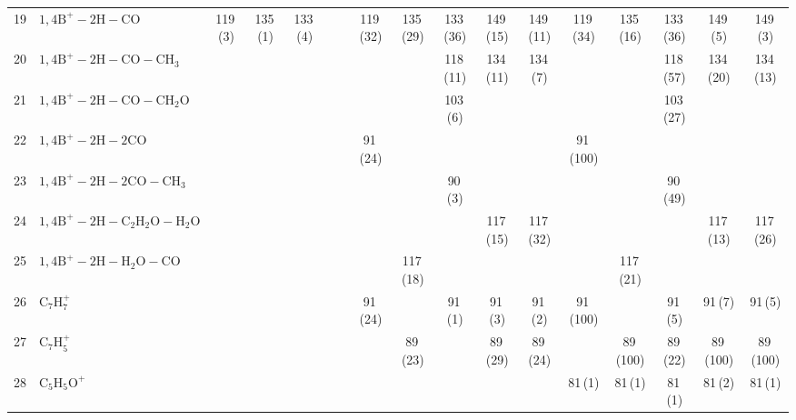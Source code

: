 \documentclass[]{article}
\begin{document}
\begin{table}
{\begin{tabular}{ll|ccccc|ccccc|ccccc}
  19 & $\mathrm{1{,}4B^+{-}2H{-}CO}$ & 119\,(3) & 135\,(1) & 133\,(4) &  &  & 119\,(32) & 135\,(29) & 133\,(36) & 149\,(15) & 149\,(11) & 119\,(34) & 135\,(16) & 133\,(36) & 149\,(5) & 149\,(3) \\ 
  20 & $\mathrm{1{,}4B^+{-}2H{-}CO{-}CH_{3}}$ &  &  &  &  &  &  &  & 118\,(11) & 134\,(11) & 134\,(7) &  &  & 118\,(57) & 134\,(20) & 134\,(13) \\ 
  21 & $\mathrm{1{,}4B^+{-}2H{-}CO{-}CH_{2}O}$ &  &  &  &  &  &  &  & 103\,(6) &  &  &  &  & 103\,(27) &  &  \\ 
  22 & $\mathrm{1{,}4B^+{-}2H{-}2CO}$ &  &  &  &  &  & 91\,(24) &  &  &  &  & 91\,(100) &  &  &  &  \\ 
  23 & $\mathrm{1{,}4B^+{-}2H{-}2CO{-}CH_{3}}$ &  &  &  &  &  &  &  & 90\,(3) &  &  &  &  & 90\,(49) &  &  \\ 
  24 & $\mathrm{1{,}4B^+{-}2H{-}C_{2}H_{2}O{-}H_{2}O}$ &  &  &  &  &  &  &  &  & 117\,(15) & 117\,(32) &  &  &  & 117\,(13) & 117\,(26) \\ 
  25 & $\mathrm{1{,}4B^+{-}2H{-}H_{2}O{-}CO}$ &  &  &  &  &  &  & 117\,(18) &  &  &  &  & 117\,(21) &  &  &  \\ 
  26 & $\mathrm{C_{7}H_{7}^+}$ &  &  &  &  &  & 91\,(24) &  & 91\,(1) & 91\,(3) & 91\,(2) & 91\,(100) &  & 91\,(5) & 91\,(7) & 91\,(5) \\ 
  27 & $\mathrm{C_{7}H_{5}^+}$ &  &  &  &  &  &  & 89\,(23) &  & 89\,(29) & 89\,(24) &  & 89\,(100) & 89\,(22) & 89\,(100) & 89\,(100) \\ 
  28 & $\mathrm{C_{5}H_{5}O^+}$ &  &  &  &  &  &  &  &  &  &  & 81\,(1) & 81\,(1) & 81\,(1) & 81\,(2) & 81\,(1) \\ 
   \bottomrule
\end{tabular}
}
\end{table}
\end{document}

